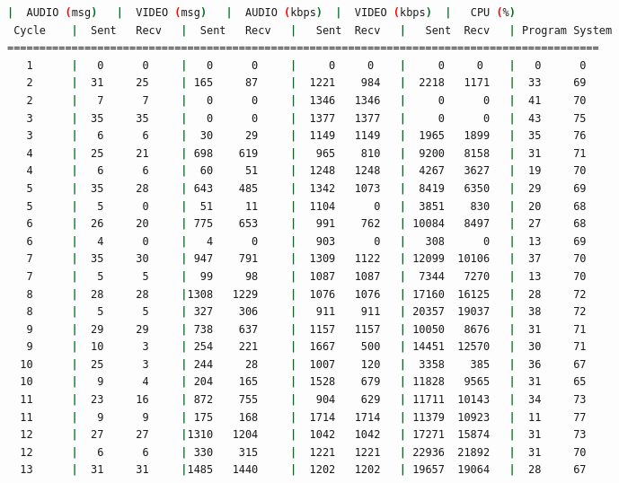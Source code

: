 \begin{adjustbox}{max width=\textwidth}
\begin{lstlisting}[language=bash,basicstyle=\ttfamily\scriptsize]
          |  AUDIO (msg)   |  VIDEO (msg)   |  AUDIO (kbps)  |  VIDEO (kbps)  |   CPU (%)
 Cycle    |  Sent   Recv   |  Sent   Recv   |   Sent  Recv   |   Sent  Recv   | Program System
============================================================================================
   1      |   0      0     |   0      0     |     0     0    |     0     0    |   0      0
   2      |  31     25     | 165     87     |  1221    984   |  2218   1171   |  33     69
   2      |   7      7     |   0      0     |  1346   1346   |     0      0   |  41     70
   3      |  35     35     |   0      0     |  1377   1377   |     0      0   |  43     75
   3      |   6      6     |  30     29     |  1149   1149   |  1965   1899   |  35     76
   4      |  25     21     | 698    619     |   965    810   |  9200   8158   |  31     71
   4      |   6      6     |  60     51     |  1248   1248   |  4267   3627   |  19     70
   5      |  35     28     | 643    485     |  1342   1073   |  8419   6350   |  29     69
   5      |   5      0     |  51     11     |  1104      0   |  3851    830   |  20     68
   6      |  26     20     | 775    653     |   991    762   | 10084   8497   |  27     68
   6      |   4      0     |   4      0     |   903      0   |   308      0   |  13     69
   7      |  35     30     | 947    791     |  1309   1122   | 12099  10106   |  37     70
   7      |   5      5     |  99     98     |  1087   1087   |  7344   7270   |  13     70
   8      |  28     28     |1308   1229     |  1076   1076   | 17160  16125   |  28     72
   8      |   5      5     | 327    306     |   911    911   | 20357  19037   |  38     72
   9      |  29     29     | 738    637     |  1157   1157   | 10050   8676   |  31     71
   9      |  10      3     | 254    221     |  1667    500   | 14451  12570   |  30     71
  10      |  25      3     | 244     28     |  1007    120   |  3358    385   |  36     67
  10      |   9      4     | 204    165     |  1528    679   | 11828   9565   |  31     65
  11      |  23     16     | 872    755     |   904    629   | 11711  10143   |  34     73
  11      |   9      9     | 175    168     |  1714   1714   | 11379  10923   |  11     77
  12      |  27     27     |1310   1204     |  1042   1042   | 17271  15874   |  31     73
  12      |   6      6     | 330    315     |  1221   1221   | 22936  21892   |  31     70
  13      |  31     31     |1485   1440     |  1202   1202   | 19657  19064   |  28     67

\end{lstlisting}
\end{adjustbox}
